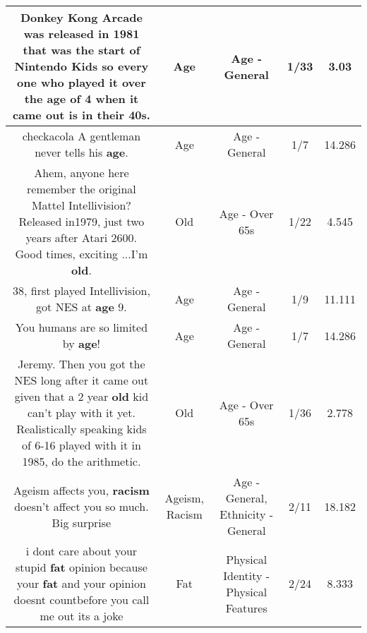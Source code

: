 \documentclass[11pt]{article}
\newlength\mylength
\begin{document}
\begin{center}
\begin{longtable}{|C{.65\mylength}|C{.30\mylength}|C{.12\mylength}|C{.12\mylength}|C{.12\mylength}|}
  \small Donkey Kong Arcade was released in 1981 that was the start of Nintendo Kids so every one who played it over the \textbf{age} of 4 when it came out is in their 40s.\normalsize   & Age & Age - General & 1/33 & 3.03 \\  \hline
  \small checkacola   A gentleman never tells his \textbf{age}.\normalsize   & Age & Age - General & 1/7 & 14.286 \\  \hline
  \small Ahem, anyone here remember the original Mattel Intellivision? Released in1979, just two years after Atari 2600. Good times, exciting ...I'm \textbf{old}.\normalsize   & Old & Age - Over 65s & 1/22 & 4.545 \\  \hline
  \small 38, first played Intellivision, got NES at \textbf{age} 9.\normalsize   & Age & Age - General & 1/9 & 11.111 \\  \hline
  \small You humans are so limited by \textbf{age}!\normalsize   & Age & Age - General & 1/7 & 14.286 \\  \hline
  \small Jeremy. Then you got the NES long after it came out given that a 2 year \textbf{old} kid can't play with it yet. Realistically speaking kids of 6-16 played with it in 1985, do the arithmetic.\normalsize   & Old & Age - Over 65s & 1/36 & 2.778 \\  \hline
  \small Ageism affects you, \textbf{racism} doesn't affect you so much. Big surprise\normalsize   & Ageism, Racism & Age - General, Ethnicity - General & 2/11 & 18.182 \\  \hline
  \small i dont care about your stupid \textbf{fat} opinion because your \textbf{fat} and your opinion doesnt countbefore you call me out its a joke\normalsize   & Fat & Physical Identity - Physical Features & 2/24 & 8.333 \\  \hline

\end{longtable}
\end{center}
\end{document}
